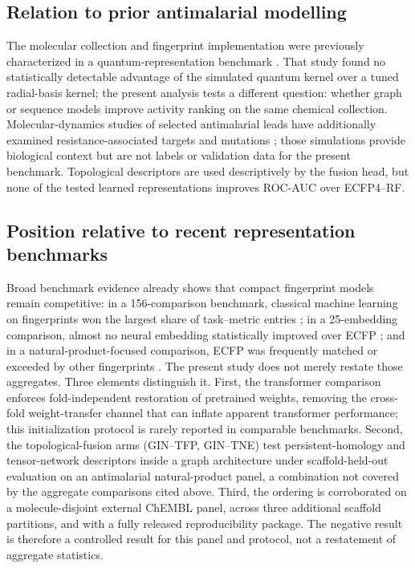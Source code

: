 \documentclass[11pt,a4paper]{article}
\begin{document}
\subsection{Relation to prior antimalarial modelling}

The molecular collection and fingerprint implementation were previously characterized in a quantum-representation benchmark \citep{temgoua2027quantum}. That study found no statistically detectable advantage of the simulated quantum kernel over a tuned radial-basis kernel; the present analysis tests a different question: whether graph or sequence models improve activity ranking on the same chemical collection. Molecular-dynamics studies of selected antimalarial leads have additionally examined resistance-associated targets and mutations \citep{temgoua2027md}; those simulations provide biological context but are not labels or validation data for the present benchmark. Topological descriptors are used descriptively by the fusion head, but none of the tested learned representations improves ROC-AUC over ECFP4--RF.

\subsection{Position relative to recent representation benchmarks}

Broad benchmark evidence already shows that compact fingerprint models remain competitive: in a \num{156}-comparison benchmark, classical machine learning on fingerprints won the largest share of task--metric entries \citep{guo_ding_2026}; in a \num{25}-embedding comparison, almost no neural embedding statistically improved over ECFP \citep{benchmark_pretrained_2025}; and in a natural-product-focused comparison, ECFP was frequently matched or exceeded by other fingerprints \citep{boldini2024}. The present study does not merely restate those aggregates. Three elements distinguish it. First, the transformer comparison enforces fold-independent restoration of pretrained weights, removing the cross-fold weight-transfer channel that can inflate apparent transformer performance; this initialization protocol is rarely reported in comparable benchmarks. Second, the topological-fusion arms (GIN--TFP, GIN--TNE) test persistent-homology and tensor-network descriptors inside a graph architecture under scaffold-held-out evaluation on an antimalarial natural-product panel, a combination not covered by the aggregate comparisons cited above. Third, the ordering is corroborated on a molecule-disjoint external ChEMBL panel, across three additional scaffold partitions, and with a fully released reproducibility package. The negative result is therefore a controlled result for this panel and protocol, not a restatement of aggregate statistics.
\end{document}
